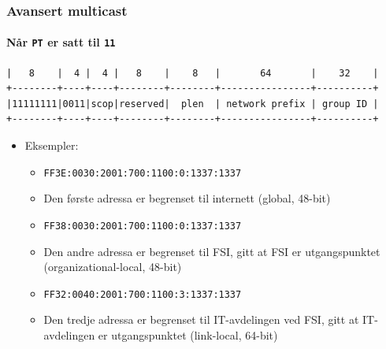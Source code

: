 \begin{frame}[fragile]%
  \frametitle{Avansert multicast}
  \framesubtitle{Når \texttt{PT} er satt til \texttt{11}}
\begin{Verbatim}[fontsize=\tiny]
|   8    |  4 |  4 |   8    |    8   |       64       |    32    |
+--------+----+----+--------+--------+----------------+----------+
|11111111|0011|scop|reserved|  plen  | network prefix | group ID |
+--------+----+----+--------+--------+----------------+----------+
\end{Verbatim}
  \begin{itemize}[<+->]
  \item Eksempler:
    \begin{itemize}[<+->]
    \item \texttt{FF3\alert<3>{E}:0030:2001:700:1100:0:1337:1337}
    \item Den første adressa er begrenset til internett (global,
      48-bit)
    \item \texttt{FF3\alert<5>{8}:0030:2001:700:1100:0:1337:1337}
    \item Den andre adressa er begrenset til FSI, gitt at FSI er
      utgangspunktet (organizational-local, 48-bit)
    \item \texttt{FF3\alert<7>{2}:0040:2001:700:1100:3:1337:1337}
    \item Den tredje adressa er begrenset til IT-avdelingen ved FSI,
      gitt at IT-avdelingen er utgangspunktet (link-local, 64-bit)
    \end{itemize}
  \end{itemize}
\end{frame}

